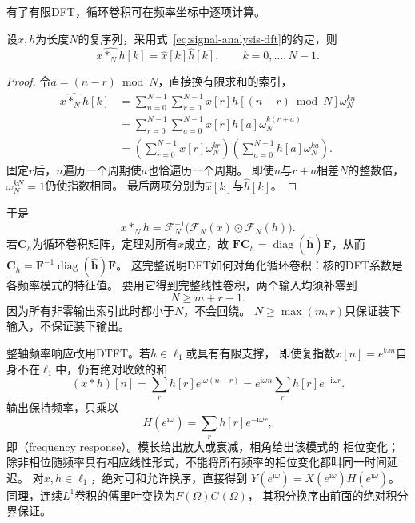 有了有限DFT，循环卷积可在频率坐标中逐项计算。
\begin{theorem}[离散循环卷积定理]
  \label{thm:signal-analysis-circular-convolution-theorem}
  设$x,h$为长度$N$的复序列，采用式~\eqref{eq:signal-analysis-dft}的约定，则
  \[
    \widehat{x*_Nh}[k]=\widehat x[k]\widehat h[k],\qquad k=0,\ldots,N-1.
  \]
\end{theorem}
\begin{proof}
  令$a=(n-r)\bmod N$，直接换有限求和的索引，
  \begin{align*}
    \widehat{x*_Nh}[k]
    &=\sum_{n=0}^{N-1}\sum_{r=0}^{N-1}
      x[r]h[(n-r)\bmod N]\omega_N^{kn}\\
    &=\sum_{r=0}^{N-1}\sum_{a=0}^{N-1}
      x[r]h[a]\omega_N^{k(r+a)}\\
    &=\left(\sum_{r=0}^{N-1}x[r]\omega_N^{kr}\right)
      \left(\sum_{a=0}^{N-1}h[a]\omega_N^{ka}\right).
  \end{align*}
  固定$r$后，$n$遍历一个周期使$a$也恰遍历一个周期。
  即使$n$与$r+a$相差$N$的整数倍，$\omega_N^{kN}=1$仍使指数相同。
  最后两项分别为$\widehat x[k]$与$\widehat h[k]$。
\end{proof}
于是
\begin{equation}
  x*_Nh=\mathcal F_N^{-1}\bigl(\mathcal F_N(x)\odot\mathcal F_N(h)\bigr).
  \label{eq:signal-analysis-frequency-domain-convolution}
\end{equation}
\BookEquationAliases{\label{eq:cnn-fft-convolution}
\label{eq:cnn-convolution-theorem-derivation}}
若$\bm C_h$为循环卷积矩阵，定理对所有$x$成立，故
$\bm F\bm C_h=\operatorname{diag}(\widehat{\bm h})\bm F$，从而
$\bm C_h=\bm F^{-1}\operatorname{diag}(\widehat{\bm h})\bm F$。
这完整说明DFT如何对角化循环卷积：核的DFT系数是各频率模式的特征值。
要用它得到完整线性卷积，两个输入均须补零到
\begin{equation}
  N\geq m+r-1.
  \label{eq:signal-analysis-linear-padding-condition}
\end{equation}
因为所有非零输出索引此时都小于$N$，不会回绕。
$N\geq\max(m,r)$只保证装下输入，不保证装下输出。

整轴频率响应改用DTFT。若$h\in\ell_1$或具有有限支撑，
即使复指数$x[n]=e^{\mathrm i\omega n}$自身不在$\ell_1$中，仍有绝对收敛的和
\[
  (x*h)[n]=\sum_r h[r]e^{\mathrm i\omega(n-r)}
  =e^{\mathrm i\omega n}\sum_r h[r]e^{-\mathrm i\omega r}.
\]
输出保持频率，只乘以
\begin{equation}
  H(e^{\mathrm i\omega})=\sum_r h[r]e^{-\mathrm i\omega r},
  \label{eq:signal-analysis-filter-frequency-response}
\end{equation}
即（frequency response）。模长给出放大或衰减，相角给出该模式的
相位变化；除非相位随频率具有相应线性形式，不能将所有频率的相位变化都叫同一时间延迟。
对$x,h\in\ell_1$，绝对可和允许换序，直接得到
$Y(e^{\mathrm i\omega})=X(e^{\mathrm i\omega})H(e^{\mathrm i\omega})$。
同理，连续$L^1$卷积的傅里叶变换为$F(\Omega)G(\Omega)$，
其积分换序由前面的绝对积分界保证。

